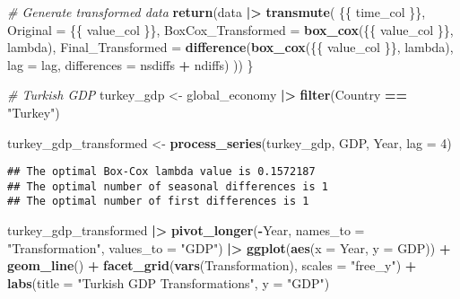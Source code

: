 \documentclass[
]{article}
\newenvironment{Shaded}{\begin{snugshade}}{\end{snugshade}}
\newcommand{\AttributeTok}[1]{\textcolor[rgb]{0.13,0.29,0.53}{#1}}
\newcommand{\CommentTok}[1]{\textcolor[rgb]{0.56,0.35,0.01}{\textit{#1}}}
\newcommand{\DecValTok}[1]{\textcolor[rgb]{0.00,0.00,0.81}{#1}}
\newcommand{\FunctionTok}[1]{\textcolor[rgb]{0.13,0.29,0.53}{\textbf{#1}}}
\newcommand{\NormalTok}[1]{#1}
\newcommand{\OtherTok}[1]{\textcolor[rgb]{0.56,0.35,0.01}{#1}}
\newcommand{\SpecialCharTok}[1]{\textcolor[rgb]{0.81,0.36,0.00}{\textbf{#1}}}
\newcommand{\StringTok}[1]{\textcolor[rgb]{0.31,0.60,0.02}{#1}}
\begin{document}
\begin{Shaded}
\begin{Highlighting}[]
  \CommentTok{\# Generate transformed data}
  \FunctionTok{return}\NormalTok{(data }\SpecialCharTok{|\textgreater{}} 
           \FunctionTok{transmute}\NormalTok{(}
\NormalTok{             \{\{ time\_col \}\},}
             \AttributeTok{Original =}\NormalTok{ \{\{ value\_col \}\},}
             \AttributeTok{BoxCox\_Transformed =} \FunctionTok{box\_cox}\NormalTok{(\{\{ value\_col \}\}, lambda),}
             \AttributeTok{Final\_Transformed =} \FunctionTok{difference}\NormalTok{(}\FunctionTok{box\_cox}\NormalTok{(\{\{ value\_col \}\}, lambda), }\AttributeTok{lag =}\NormalTok{ lag, }\AttributeTok{differences =}\NormalTok{ nsdiffs }\SpecialCharTok{+}\NormalTok{ ndiffs)}
\NormalTok{           ))}
\NormalTok{\}}

\CommentTok{\# Turkish GDP}
\NormalTok{turkey\_gdp }\OtherTok{\textless{}{-}}\NormalTok{ global\_economy }\SpecialCharTok{|\textgreater{}} 
  \FunctionTok{filter}\NormalTok{(Country }\SpecialCharTok{==} \StringTok{"Turkey"}\NormalTok{)}

\NormalTok{turkey\_gdp\_transformed }\OtherTok{\textless{}{-}} \FunctionTok{process\_series}\NormalTok{(turkey\_gdp, GDP, Year, }\AttributeTok{lag =} \DecValTok{4}\NormalTok{)}
\end{Highlighting}
\end{Shaded}

\begin{verbatim}
## The optimal Box-Cox lambda value is 0.1572187 
## The optimal number of seasonal differences is 1 
## The optimal number of first differences is 1
\end{verbatim}

\begin{Shaded}
\begin{Highlighting}[]
\NormalTok{turkey\_gdp\_transformed }\SpecialCharTok{|\textgreater{}} 
  \FunctionTok{pivot\_longer}\NormalTok{(}\SpecialCharTok{{-}}\NormalTok{Year, }\AttributeTok{names\_to =} \StringTok{"Transformation"}\NormalTok{, }\AttributeTok{values\_to =} \StringTok{"GDP"}\NormalTok{) }\SpecialCharTok{|\textgreater{}} 
  \FunctionTok{ggplot}\NormalTok{(}\FunctionTok{aes}\NormalTok{(}\AttributeTok{x =}\NormalTok{ Year, }\AttributeTok{y =}\NormalTok{ GDP)) }\SpecialCharTok{+}
  \FunctionTok{geom\_line}\NormalTok{() }\SpecialCharTok{+}
  \FunctionTok{facet\_grid}\NormalTok{(}\FunctionTok{vars}\NormalTok{(Transformation), }\AttributeTok{scales =} \StringTok{"free\_y"}\NormalTok{) }\SpecialCharTok{+}
  \FunctionTok{labs}\NormalTok{(}\AttributeTok{title =} \StringTok{"Turkish GDP Transformations"}\NormalTok{, }\AttributeTok{y =} \StringTok{"GDP"}\NormalTok{)}
\end{Highlighting}
\end{Shaded}
\end{document}
